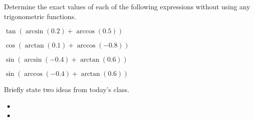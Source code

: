 \begin{problem}
\item Determine the exact values of each of the following expressions
  without using any trigonometric functions.
  \begin{subproblem}
  \item ${\displaystyle \tan(\arcsin(0.2)+\arccos(0.5))}$
    \vfill
  \item ${\displaystyle \cos(\arctan(0.1)+\arccos(-0.8))}$
    \vfill
  \item ${\displaystyle \sin(\arcsin(-0.4)+\arctan(0.6))}$
    \vfill
  \item ${\displaystyle \sin(\arccos(-0.4)+\arctan(0.6))}$
    \vfill
  \end{subproblem}
\end{problem}

\postClass

\begin{problem}
\item Briefly state two ideas from today's class.
  \begin{itemize}
  \item 
  \item 
  \end{itemize}
\item 
  \begin{subproblem}
    \item
  \end{subproblem}
\end{problem}



